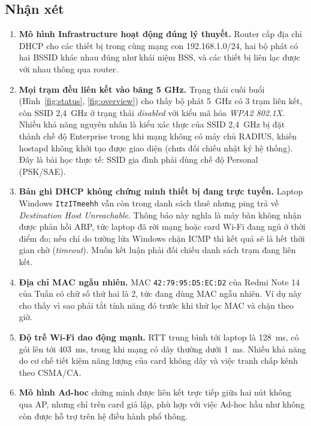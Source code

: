 \documentclass[12pt,a4paper]{article}
\numberwithin{figure}{section}
\numberwithin{table}{section}
\newcommand{\mono}[1]{\texttt{#1}}
\begin{document}
\subsection{Nhận xét}
\label{subsec:nhanxet}
\begin{enumerate}
  \item \textbf{Mô hình Infrastructure hoạt động đúng lý thuyết.} Router cấp
    địa chỉ DHCP cho các thiết bị trong cùng mạng con 192.168.1.0/24, hai bộ
    phát có hai BSSID khác nhau đúng như khái niệm BSS, và các thiết bị liên
    lạc được với nhau thông qua router.
  \item \textbf{Mọi trạm đều liên kết vào băng 5 GHz.} Trạng thái cuối buổi
    (Hình~\ref{fig:status}, \ref{fig:overview}) cho thấy bộ phát 5~GHz có 3
    trạm liên kết, còn SSID 2,4~GHz ở trạng thái \emph{disabled} với kiểu mã
    hóa \emph{WPA2 802.1X}. Nhiều khả năng nguyên nhân là kiểu xác thực của SSID 2,4~GHz bị
    đặt thành chế độ Enterprise trong khi mạng không có máy chủ RADIUS, khiến
    hostapd không khởi tạo được giao diện (chưa đối chiếu nhật ký hệ thống). Đây là bài học thực tế: SSID gia
    đình phải dùng chế độ Personal (PSK/SAE).
  \item \textbf{Bản ghi DHCP không chứng minh thiết bị đang trực tuyến.}
    Laptop Windows \mono{ItzITmeehh} vẫn còn trong danh sách thuê nhưng ping trả
    về \emph{Destination Host Unreachable}. Thông báo này nghĩa là máy bàn không
    nhận được phản hồi ARP, tức laptop đã rời mạng hoặc card Wi-Fi đang ngủ ở
    thời điểm đo; nếu chỉ do tường lửa Windows chặn ICMP thì kết quả sẽ là hết
    thời gian chờ (\emph{timeout}). Muốn kết luận phải đối chiếu danh sách trạm
    đang liên kết.
  \item \textbf{Địa chỉ MAC ngẫu nhiên.} MAC \mono{42:79:95:D5:EC:D2} của
    Redmi Note 14 của Tuấn có chữ số thứ hai là 2, tức đang dùng MAC ngẫu nhiên. Ví dụ
    này cho thấy vì sao phải tắt tính năng đó trước khi thử lọc MAC và chặn
    theo giờ.
  \item \textbf{Độ trễ Wi-Fi dao động mạnh.} RTT trung bình tới laptop là
    128~ms, có gói lên tới 403~ms, trong khi mạng có dây thường dưới 1~ms.
    Nhiều khả năng do cơ chế tiết kiệm năng lượng của card không dây và việc
    tranh chấp kênh theo CSMA/CA.
  \item \textbf{Mô hình Ad-hoc} chứng minh được liên kết trực tiếp giữa hai
    nút không qua AP, nhưng chỉ trên card giả lập, phù hợp với việc Ad-hoc
    hầu như không còn được hỗ trợ trên hệ điều hành phổ thông.
\end{enumerate}
\end{document}
